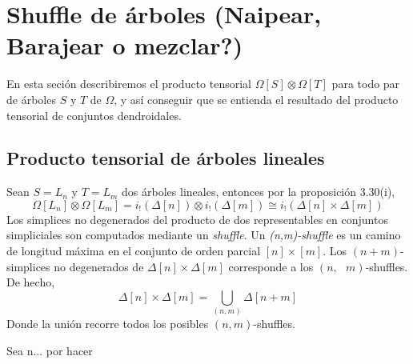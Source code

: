 \documentclass[../main.tex]{subfiles}
\begin{document}
\section{Shuffle de \'arboles (Naipear, Barajear o mezclar?)}
En esta seci\'on describiremos el producto tensorial $\Omega[S]\otimes\Omega[T]$ para todo par de \'arboles $S$ y $T$ de $\Omega$, y as\'i conseguir que se entienda el resultado del producto tensorial de conjuntos dendroidales.
\subsection{Producto tensorial de \'arboles lineales}
Sean $S=L_n$ y $T=L_m$ dos \'arboles lineales, entonces por la proposici\'on 3.30(i),
$$
    \Omega[L_n]\otimes\Omega[L_m]=i_!(\Delta[n])\otimes i_!(\Delta[m])\cong i_!(\Delta[n]\times\Delta[m])
$$
Los simplices no degenerados del producto de dos representables en conjuntos simpliciales son computados mediante un \emph{shuffle}. Un \emph{(n,m)-shuffle} es un camino de longitud m\'axima en el conjunto de orden parcial $[n]\times[m]$.
Los $(n+m)$-simplices no degenerados de $\Delta[n]\times\Delta[m]$ corresponde a los $(n,\text{ }m)$-shuffles. De hecho,
$$
    \Delta[n]\times\Delta[m] = \bigcup_{(n,m)}\Delta[n+m]
$$
Donde la uni\'on recorre todos los posibles $(n,m)$-shuffles.
\begin{ex}
    Sea n... por hacer
\end{ex}
\end{document}
